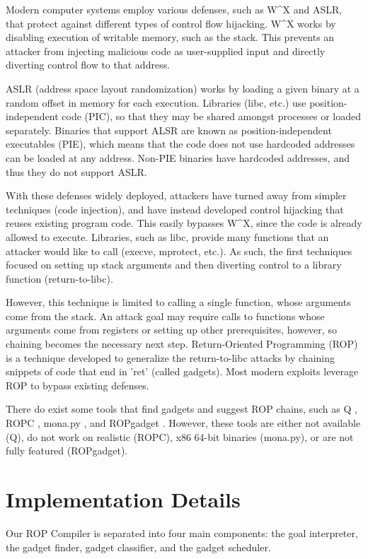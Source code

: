 \documentclass[journal]{IEEEtran}
\begin{document}
Modern computer systems employ various defenses, such as W\^{}X and ASLR, that
protect against different types of control flow hijacking. W\^{}X works by
disabling execution of writable memory, such as the stack. This prevents an
attacker from injecting malicious code as user-supplied input and directly
diverting control flow to that address.

ASLR (address space layout randomization) works by loading a given binary at a random offset in memory for
each execution. Libraries (libc, etc.) use position-independent code (PIC),
so that they may be shared amongst processes or loaded separately. Binaries that
support ALSR are known as position-independent executables (PIE), which means
that the code does not use hardcoded addresses can be loaded at any address.
Non-PIE binaries have hardcoded addresses, and thus they do not support ASLR.

With these defenses widely deployed, attackers have turned away from simpler
techniques (code injection), and have instead developed control hijacking that
reuses existing program code. This easily bypasses W\^{}X, since the code is
already allowed to execute. Libraries, such as libc, provide many functions that
an attacker would like to call (execve, mprotect, etc.). As such, the first
techniques focused on setting up stack arguments and then diverting control to a
library function (return-to-libc).

However, this technique is limited to calling a single function, whose arguments
come from the stack. An attack goal may require calls to functions whose
arguments come from registers or setting up other prerequisites, however, so
chaining becomes the necessary next step. Return-Oriented Programming (ROP) \cite{rop} is a
technique developed to generalize the return-to-libc attacks by chaining
snippets of code that end in 'ret' (called gadgets). Most modern exploits leverage ROP to bypass existing defenses.

There do exist some tools that find gadgets and suggest ROP chains, such as Q \cite{schwartz2011q},
ROPC \cite{ropc}, mona.py \cite{mona}, and ROPgadget \cite{ropgadget}. However, these tools are either not available (Q),
do not work on realistic (ROPC), x86 64-bit binaries (mona.py), or are not fully featured (ROPgadget).

\section{Implementation Details}
Our ROP Compiler is separated into four main components: the goal interpreter, the gadget finder, gadget classifier, and the gadget scheduler.
\end{document}
